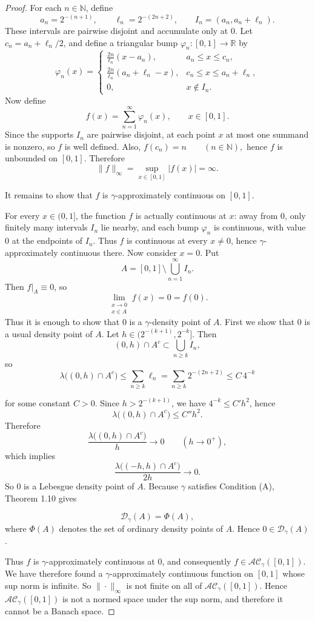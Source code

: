 \documentclass{amsart}
\theoremstyle{plain}
\numberwithin{equation}{section}
\begin{document}
\begin{proof}
For each $n\in \mathbb{N}$, define
$$ a_n=2^{-(n+1)}, \qquad \ell_n=2^{-(2n+2)}, \qquad I_n=(a_n,a_n+\ell_n).$$
These intervals are pairwise disjoint and accumulate only at $0$.
Let $c_n=a_n+\ell_n/2$, and define a triangular bump $\varphi_n:[0,1]\to \mathbb{R}$ by  $$ \varphi_n(x)=
\begin{cases}
\frac{2n}{\ell_n}(x-a_n), & a_n\leq x\leq c_n,\\[4pt]
\frac{2n}{\ell_n}(a_n+\ell_n-x), & c_n\leq x\leq a_n+\ell_n,\\[4pt]
0, & x\notin I_n.
\end{cases}$$
Now define
$$f(x)=\sum_{n=1}^\infty \varphi_n(x), \qquad x\in [0,1]. $$
Since the supports $I_n$ are pairwise disjoint, at each point $x$ at most one summand is nonzero, so $f$ is well defined.
Also, $f(c_n)=n \qquad (n\in \mathbb{N}),$
hence $f$ is unbounded on $[0,1]$. Therefore
$$ \|f\|_\infty=\sup_{x\in [0,1]} |f(x)|=\infty.$$

It remains to show that $f$ is $\gamma$-approximately continuous on $[0,1]$.

For every $x\in (0,1]$, the function $f$ is actually continuous at $x$: away from $0$, only finitely many intervals $I_n$ lie nearby, and each bump $\varphi_n$ is continuous, with value $0$ at the endpoints of $I_n$. Thus $f$ is continuous at every $x\neq 0$, hence $\gamma$-approximately continuous there.
Now consider $x=0$. Put
$$A=[0,1]\setminus \bigcup_{n=1}^\infty I_n. $$
Then $f|_A\equiv 0$, so
$$\lim_{\substack{x\to 0\\ x\in A}} f(x)=0=f(0). $$
Thus it is enough to show that $0$ is a $\gamma$-density point of $A$.
First we show that $0$ is a usual density point of $A$. Let $h\in (2^{-(k+1)}, 2^{-k}]$. Then
$$ (0,h)\cap A^c \subset \bigcup_{n\geq k} I_n, $$
so $$
\lambda\bigl((0,h)\cap A^c\bigr)\leq \sum_{n\geq k}\ell_n
=\sum_{n\geq k}2^{-(2n+2)}
\leq C\,4^{-k} $$

for some constant $C>0$. Since $h>2^{-(k+1)}$, we have $4^{-k}\leq C'h^2$, hence
$$ \lambda\bigl((0,h)\cap A^c\bigr)\leq C''h^2. $$
Therefore
$$\frac{\lambda\bigl((0,h)\cap A^c\bigr)}{h}\to 0
\qquad (h\to 0^+), $$
which implies
$$ \frac{\lambda\bigl((-h,h)\cap A^c\bigr)}{2h}\to 0. $$
So $0$ is a Lebesgue density point of $A$.
Because $\gamma$ satisfies Condition (A), Theorem 1.10 gives

$$\mathcal{D}_\gamma(A)=\Phi(A),$$
where $\Phi(A)$ denotes the set of ordinary density points of $A$. Hence $0\in \mathcal{D}_\gamma(A)$.

Thus $f$ is $\gamma$-approximately continuous at $0$, and consequently $f\in \mathcal{AC}_\gamma([0,1])$.
We have therefore found a $\gamma$-approximately continuous function on $[0,1]$ whose sup norm is infinite. So $\|\cdot\|_\infty$ is not finite on all of $\mathcal{AC}_\gamma([0,1])$. Hence $\mathcal{AC}_\gamma([0,1])$ is not a normed space under the sup norm, and therefore it cannot be a Banach space. 
\end{proof}
\end{document}
